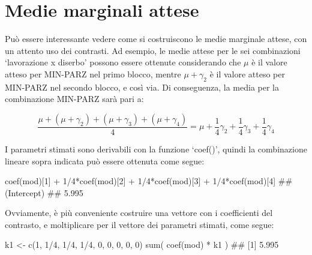 \documentclass[a4paper,12pt,oneside]{book}
\newenvironment{Shaded}{}{}
\newcommand{\KeywordTok}[1]{#1}
\newcommand{\DecValTok}[1]{#1}
\newcommand{\StringTok}[1]{#1}
\newcommand{\CommentTok}[1]{#1}
\newcommand{\OperatorTok}[1]{#1}
\newcommand{\NormalTok}[1]{#1}
\begin{document}
\hypertarget{medie-marginali-attese-1}{%
\section{Medie marginali attese}\label{medie-marginali-attese-1}}

Può essere interessante vedere come si costruiscono le medie marginale attese, con un attento uso dei contrasti. Ad esempio, le medie attese per le sei combinazioni `lavorazione x diserbo' possono essere ottenute considerando che \(\mu\) è il valore atteso per MIN-PARZ nel primo blocco, mentre \(\mu + \gamma_2\) è il valore atteso per MIN-PARZ nel secondo blocco, e così via. Di conseguenza, la media per la combinazione MIN-PARZ sarà pari a:

\[ \frac{\mu + (\mu + \gamma_2) + (\mu + \gamma_3) + (\mu + \gamma_4)}{4} = \mu + \frac{1}{4}\gamma_2 + \frac{1}{4}\gamma_3 + \frac{1}{4}\gamma_4\]

I parametri stimati sono derivabili con la funzione `coef()', quindi la combinazione lineare sopra indicata può essere ottenuta come segue:

\begin{Shaded}
\begin{Highlighting}[]
\KeywordTok{coef}\NormalTok{(mod)[}\DecValTok{1}\NormalTok{] }\OperatorTok{+}\StringTok{ }\DecValTok{1}\OperatorTok{/}\DecValTok{4}\OperatorTok{*}\KeywordTok{coef}\NormalTok{(mod)[}\DecValTok{2}\NormalTok{] }\OperatorTok{+}\StringTok{ }\DecValTok{1}\OperatorTok{/}\DecValTok{4}\OperatorTok{*}\KeywordTok{coef}\NormalTok{(mod)[}\DecValTok{3}\NormalTok{] }\OperatorTok{+}\StringTok{ }\DecValTok{1}\OperatorTok{/}\DecValTok{4}\OperatorTok{*}\KeywordTok{coef}\NormalTok{(mod)[}\DecValTok{4}\NormalTok{]}
\CommentTok{## (Intercept) }
\CommentTok{##       5.995}
\end{Highlighting}
\end{Shaded}

Ovviamente, è più conveniente costruire una vettore con i coefficienti del contrasto, e moltiplicare per il vettore dei parametri stimati, come segue:

\begin{Shaded}
\begin{Highlighting}[]
\NormalTok{k1 <-}\StringTok{ }\KeywordTok{c}\NormalTok{(}\DecValTok{1}\NormalTok{, }\DecValTok{1}\OperatorTok{/}\DecValTok{4}\NormalTok{, }\DecValTok{1}\OperatorTok{/}\DecValTok{4}\NormalTok{, }\DecValTok{1}\OperatorTok{/}\DecValTok{4}\NormalTok{, }\DecValTok{0}\NormalTok{, }\DecValTok{0}\NormalTok{, }\DecValTok{0}\NormalTok{, }\DecValTok{0}\NormalTok{, }\DecValTok{0}\NormalTok{)}
\KeywordTok{sum}\NormalTok{( }\KeywordTok{coef}\NormalTok{(mod) }\OperatorTok{*}\StringTok{ }\NormalTok{k1 )}
\CommentTok{## [1] 5.995}
\end{Highlighting}
\end{Shaded}
\end{document}

